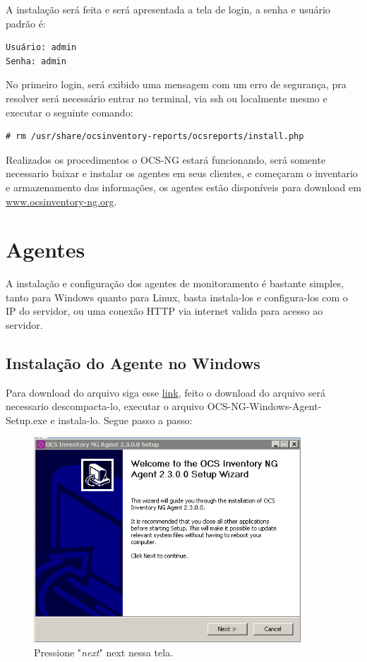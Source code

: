 \documentclass[
               12pt,             %
               a4paper,          %
               chapter=TITLE,    %
               section=TITLE,    %
               english,
               brazil            
]{article}
\begin{document}
A instalação será feita e será apresentada a tela de login, a senha e usuário padrão é:

\begin{verbatim}
Usuário: admin
Senha: admin
\end{verbatim}

No primeiro login, será exibido uma mensagem com um erro de segurança, pra resolver será necessário entrar no terminal, via ssh ou localmente mesmo e executar o seguinte comando:

\begin{verbatim}
# rm /usr/share/ocsinventory-reports/ocsreports/install.php
\end{verbatim}

Realizados os procedimentos o OCS-NG estará funcionando, será somente necessario baixar e instalar os agentes em seus clientes, e começaram o inventario e armazenamento das informações, os agentes estão disponíveis para download em \href{www.ocsinventory-ng.org}{www.ocsinventory-ng.org}.

\section{Agentes}

A instalação e configuração dos agentes de monitoramento é bastante simples, tanto para Windows quanto para Linux, basta instala-los e configura-los com o IP do servidor, ou uma conexão HTTP via internet valida para acesso ao servidor.

\subsection{Instalação do Agente no Windows}

Para download do arquivo siga esse \href{https://github.com/OCSInventory-NG/WindowsAgent/releases/download/2.3/OCSNG-Windows-Agent-2.3.0.0.zip}{link}, feito o download do arquivo será necessario descompacta-lo, executar o arquivo OCS-NG-Windows-Agent-Setup.exe e instala-lo. Segue passo a passo:\\

\begin{figure}[h]

	\center
	\includegraphics[width=10cm]{imagens/1.PNG}
	\caption{Pressione "\textit{next}" next nessa tela.}
	

\end{figure}
\end{document}
